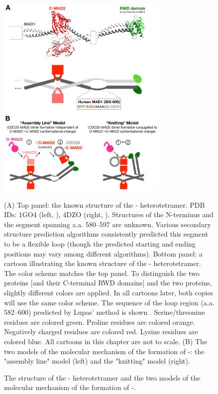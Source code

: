 \begin{figure}
    \centering
    \includegraphics[width=0.73\textwidth]{chapters/figures/MAD1C+KnittingModel.pdf}
    \caption{The structure of the - heterotetramer and the two models of the molecular mechanism of the formation of -.}
    \noindent\justifying (A) Top panel: the known structure of the - heterotetramer. PDB IDs: 1GO4 (left, \cite{Structure1GO4}), 4DZO (right, \cite{Structure4DZO}). Structures of the N-terminus and the segment spanning a.a. 580--597 are unknown. Various secondary structure prediction algorithms consistently predicted this segment to be a flexible loop (though the predicted starting and ending positions may vary among different algorithms). Bottom panel: a cartoon illustrating the known structure of the - heterotetramer. The color scheme matches the top panel. To distinguish the two  proteins [and their C-terminal RWD domains] and the two  proteins, slightly different colors are applied. In all cartoons later, both copies will use the same color scheme. The sequence of the loop region (a.a. 582--600) predicted by Lupas' method is shown \cite{LupasCOILS}. Serine/threonine residues are colored green. Proline residues are colored orange. Negatively charged residues are colored red. Lysine residues are colored blue. All cartoons in this chapter are not to scale. (B) The two models of the molecular mechanism of the formation of -: the "assembly line" model (left) and the "knitting" model (right).
    \label{MAD1C+KnittingModel}
\end{figure}

